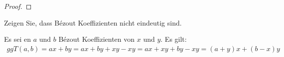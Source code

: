 \begin{proof}
\end{proof}

\begin{ueb}
	Zeigen Sie, dass Bézout Koeffizienten nicht eindeutig sind.
	\begin{lsg}
		Es sei en $a$ und $b$ Bézout Koeffizienten von $x$ und $y$. Es gilt:
		\begin{align*}
			ggT(a,b) = ax+by = ax+by+xy-xy=ax+xy+by-xy=(a+y)x+(b-x)y
		\end{align*}
	\end{lsg}
\end{ueb}


